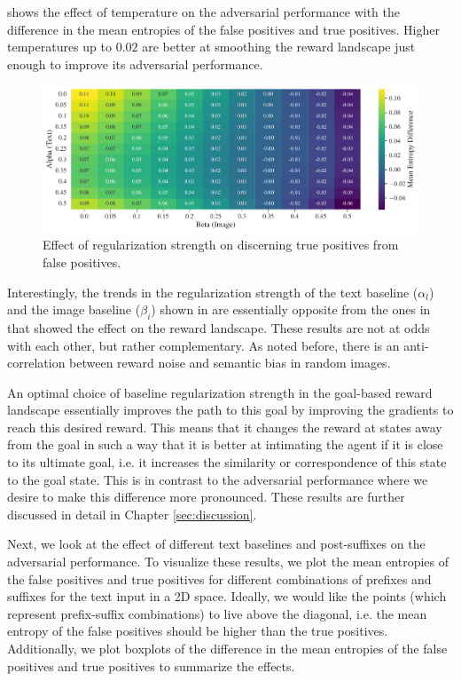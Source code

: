  shows the effect of temperature on the adversarial performance with the difference in the mean entropies of the false positives and true positives.
Higher temperatures up to \(0.02\) are better at smoothing the reward landscape just enough to improve its adversarial performance.

\begin{figure}[H]
    \centering
    \includegraphics[width=\textwidth]{images/alpha_beta_adversarial.pdf}
    \caption{Effect of regularization strength on discerning true positives from false positives.}
    \label{fig:clip-alpha-beta-adversarial}
\end{figure}

Interestingly, the trends in the regularization strength of the text baseline (\(\alpha_{l}\)) and the image baseline (\(\beta_{i}\)) shown in  are essentially opposite from the ones in  that showed the effect on the reward landscape.
These results are not at odds with each other, but rather complementary. 
As noted before, there is an anti-correlation between reward noise and semantic bias in random images.

An optimal choice of baseline regularization strength in the goal-based reward landscape essentially improves the path to this goal by improving the gradients to reach this desired reward.
This means that it changes the reward at states away from the goal in such a way that it is better at intimating the agent if it is close to its ultimate goal, i.e. it increases the similarity or correspondence of this state to the goal state.
This is in contrast to the adversarial performance where we desire to make this difference more pronounced.
These results are further discussed in detail in Chapter \ref{sec:discussion}.

Next, we look at the effect of different text baselines and post-suffixes on the adversarial performance.
To visualize these results, we plot the mean entropies of the false positives and true positives for different combinations of prefixes and suffixes for the text input in a 2D space.
Ideally, we would like the points (which represent prefix-suffix combinations) to live above the diagonal, i.e. the mean entropy of the false positives should be higher than the true positives.
Additionally, we plot boxplots of the difference in the mean entropies of the false positives and true positives to summarize the effects.

